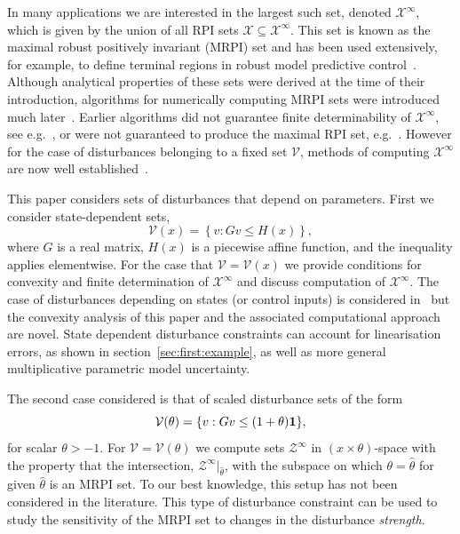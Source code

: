 \documentclass[letterpaper, 10pt, conference]{ieeeconf} %
\begin{document}
In many applications we are interested in the largest such set, denoted $\mathcal X^\infty$, which is given 
by the union of all RPI sets $\mathscr X\subseteq\mathcal X^\infty$. This set is known as the maximal robust 
positively invariant (MRPI) set and has been used extensively, for example, to define terminal regions in 
robust model predictive control~\cite{mayne:2000}. Although analytical properties
of these sets were derived at the time of their introduction, algorithms for numerically computing MRPI sets 
were introduced much later~\cite{Blanchini:1994,DeSantis:1994,Kolmanovsky:1998}. 
Earlier algorithms did not guarantee finite determinability of $\mathcal X^\infty$, see e.g.~\cite{Blanchini:1990}, 
or were not guaranteed to produce the maximal RPI set, e.g.~\cite{Blanchini:1991}. 
%
However for the case of disturbances belonging to a fixed set $\mathscr V$, methods of computing 
$\mathcal X^\infty$ are now well established~\cite{blanchini:2007}.

This paper considers sets of disturbances that depend on
parameters. First we consider state-dependent sets,
\begin{equation}\label{eq:PWA:disturbance:set}
	\mathcal V(x) = \left\{v: Gv\leq H(x)\right\},
\end{equation}
where $G$ is a real matrix,
$H(x)$ is a piecewise affine function, and the inequality applies elementwise. For the case that $\mathscr V=\mathcal V(x)$ we
provide conditions for convexity and finite determination of $\mathcal X^\infty$ and discuss 
computation of $\mathcal X^\infty$. The case of disturbances depending on states (or control inputs) 
is considered in~\cite{Kuntsevich:1995,rakovic06} but the convexity
analysis of this paper and the associated computational approach are novel. 
State dependent disturbance constraints can account for linearisation errors, as shown in section~\ref{sec:first:example}, 
as well as more general multiplicative parametric model uncertainty.

The second case considered is that of scaled disturbance sets of the form
\begin{equation}
  \mathcal V(\theta) = \{v:Gv\leq(1+\theta){\bf{1}}\},
\end{equation}
for scalar $\theta>-1$. For $\mathscr V = \mathcal V(\theta)$ we compute sets $\mathcal Z^\infty$ in 
$(x\times\theta)$-space with the property that 
the intersection, $\mathcal Z^\infty\vert_{\hat\theta}$, with the subspace on which $\theta=\hat\theta$ 
for given $\hat\theta$ is an MRPI set. To our best knowledge, this setup has not been 
considered in the literature. This type of disturbance constraint can be used to study the sensitivity of
the MRPI set to changes in the disturbance \emph{strength}.
\end{document}
